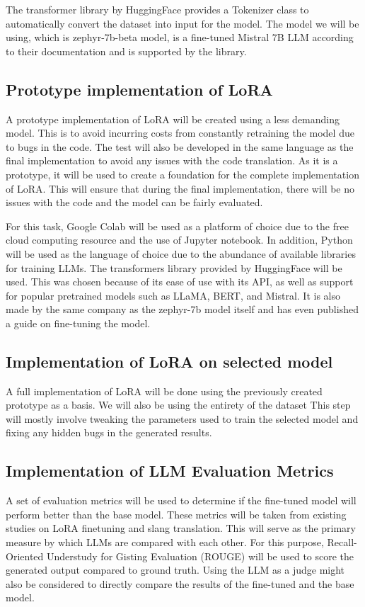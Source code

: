 The transformer library by HuggingFace provides a Tokenizer class to automatically convert the dataset into input for the model. 
The model we will be using, which is zephyr-7b-beta model, is a fine-tuned Mistral 7B LLM according to their documentation and is supported by the library. 

\subsection{Prototype implementation of LoRA}
A prototype implementation of LoRA will be created using a less demanding model.
This is to avoid incurring costs from constantly retraining the model due to bugs in the code.
The test will also be developed in the same language as the final implementation to avoid any issues with the code translation.
As it is a prototype, it will be used to create a foundation for the complete implementation of LoRA.
This will ensure that during the final implementation, there will be no issues with the code and the model can be fairly evaluated.

For this task, Google Colab will be used as a platform of choice due to the free cloud computing resource and the use of Jupyter notebook.
In addition, Python will be used as the language of choice due to the abundance of available libraries for training LLMs. The transformers library provided by HuggingFace will be used.
This was chosen because of its ease of use with its API, as well as support for popular pretrained models such as LLaMA, BERT, and Mistral.
It is also made by the same company as the zephyr-7b model itself and has even published a guide on fine-tuning the model.

\subsection{Implementation of LoRA on selected model}
A full implementation of LoRA will be done using the previously created prototype as a basis.
We will also be using the entirety of the dataset
This step will mostly involve tweaking the parameters used to train the selected model and fixing any hidden bugs in the generated results.

\subsection{Implementation of LLM Evaluation Metrics}
A set of evaluation metrics will be used to determine if the fine-tuned model will perform better than the base model.
These metrics will be taken from existing studies on LoRA finetuning and slang translation.
This will serve as the primary measure by which LLMs are compared with each other.
For this purpose, Recall-Oriented Understudy for Gisting Evaluation (ROUGE) will be used to score the generated output compared to ground truth.
Using the LLM as a judge might also be considered to directly compare the results of the fine-tuned and the base model.

